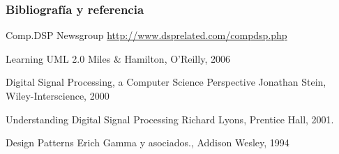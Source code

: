 \begin{frame}
  \frametitle{Bibliografía y referencia}
  \begin{thebibliography}{5}
    \beamertemplatearticlebibitems
    Comp.DSP Newsgroup
    \newblock \url{http://www.dsprelated.com/compdsp.php}
    
    \beamertemplatebookbibitems



    Learning UML 2.0            
    \newblock Miles \& Hamilton, O'Reilly, 2006

Digital Signal Processing, a Computer Science Perspective \newblock Jonathan Stein, Wiley-Interscience, 2000
    
    Understanding Digital Signal Processing
    \newblock Richard Lyons, Prentice Hall, 2001.
    
    Design Patterns
    \newblock Erich Gamma y asociados., Addison Wesley, 1994
  \end{thebibliography}
\end{frame}


